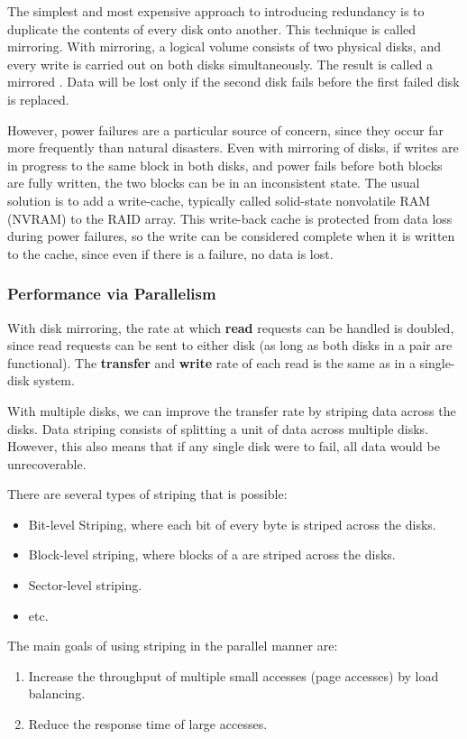 The simplest and most expensive approach to introducing redundancy is to duplicate the contents of every disk onto another.
This technique is called mirroring.
With mirroring, a logical volume consists of two physical disks, and every write is carried out on both disks simultaneously.
The result is called a mirrored .
Data will be lost only if the second disk fails before the first failed disk is replaced.

However, power failures are a particular source of concern, since they occur far more frequently than natural disasters.
Even with mirroring of disks, if writes are in progress to the same block in both disks, and power fails before both blocks are fully written, the two blocks can be in an inconsistent state.
The usual solution is to add a write-cache, typically called solid-state nonvolatile RAM (NVRAM) to the RAID array.
This write-back cache is protected from data loss during power failures, so the write can be considered complete when it is written to the cache, since even if there is a failure, no data is lost.

\subsubsection{Performance via Parallelism}\label{subsubsec:RAID_Performance_Parallelism}
With disk mirroring, the rate at which \textbf{read} requests can be handled is doubled, since read requests can be sent to either disk (as long as both disks in a pair are functional).
The \textbf{transfer} and \textbf{write} rate of each read is the same as in a single-disk system.

With multiple disks, we can improve the transfer rate by striping data across the disks.
Data striping consists of splitting a unit of data across multiple disks.
However, this also means that if any single disk were to fail, all data would be unrecoverable.

There are several types of striping that is possible:
\begin{itemize}[noitemsep]
\item Bit-level Striping, where each bit of every byte is striped across the disks.
\item Block-level striping, where blocks of a  are striped across the disks.
\item Sector-level striping.
\item etc.
\end{itemize}

The main goals of using striping in the parallel manner are:
\begin{enumerate}[noitemsep]
\item Increase the throughput of multiple small accesses (page accesses) by load balancing.
\item Reduce the response time of large accesses.
\end{enumerate}


